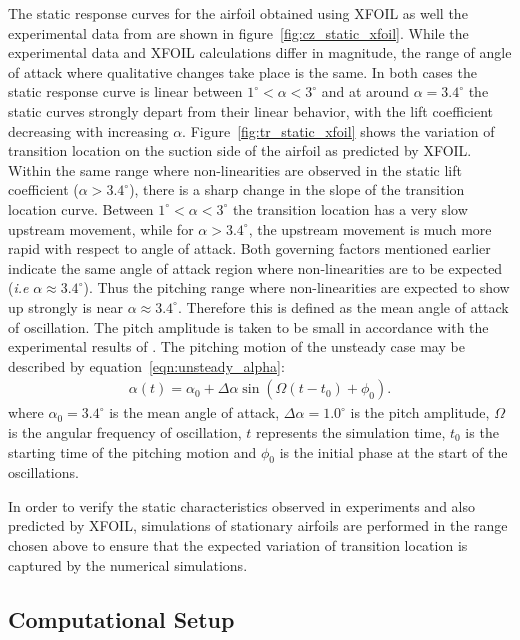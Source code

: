 The static response curves for the airfoil obtained using XFOIL as well the experimental data from \cite{lokattthesis} are shown in figure~\ref{fig:cz_static_xfoil}. While the experimental data and XFOIL calculations differ in magnitude, the range of angle of attack where qualitative changes take place is the same. In both cases the static response curve is linear between $1^{\circ}<\alpha<3^{\circ}$ and at around $\alpha=3.4^{\circ}$ the static curves strongly depart from their linear behavior, with the lift coefficient decreasing with increasing $\alpha$. Figure~\ref{fig:tr_static_xfoil} shows the variation of transition location on the suction side of the airfoil as predicted by XFOIL. Within the same range where non-linearities are observed in the static lift coefficient ($\alpha>3.4^{\circ}$), there is a sharp change in the slope of the transition location curve. Between $1^{\circ}<\alpha<3^{\circ}$ the transition location has a very slow upstream movement, while for $\alpha>3.4^{\circ}$, the upstream movement is much more rapid with respect to angle of attack. Both governing factors mentioned earlier indicate the same angle of attack region where non-linearities are to be expected (\textit{i.e} $\alpha\approx3.4^{\circ}$). Thus the pitching range where non-linearities are expected to show up strongly is near $\alpha\approx3.4^{\circ}$. Therefore this is defined as the mean angle of attack of oscillation. The pitch amplitude is taken to be small in accordance with the experimental results of \cite{lokattthesis}. The pitching motion of the unsteady case may be described by equation~\ref{eqn:unsteady_alpha}:
\begin{align}
	\alpha(t) = \alpha_{0} + \Delta\alpha\sin(\Omega (t-t_{0}) + \phi_{0}).
	\label{eqn:unsteady_alpha}
\end{align}
where $\alpha_{0}=3.4^{\circ}$ is the mean angle of attack, $\Delta\alpha=1.0^{\circ}$ is the pitch amplitude, $\Omega$ is the angular frequency of oscillation, $t$ represents the simulation time, $t_{0}$ is the starting time of the pitching motion and $\phi_{0}$ is the initial phase at the start of the oscillations.

In order to verify the static characteristics observed in experiments and also predicted by XFOIL, simulations of stationary airfoils are performed in the range chosen above to ensure that the expected variation of transition location is captured by the numerical simulations. 

\subsection{Computational Setup}

